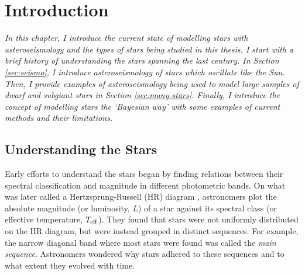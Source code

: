 %
%
%
%
%
\chapter[Introduction]{Introduction}

\textit{In this chapter, I introduce the current state of modelling stars with asteroseismology and the types of stars being studied in this thesis. I start with a brief history of understanding the stars spanning the last century. In Section \ref{sec:seismo}, I introduce asteroseismology of stars which oscillate like the Sun. Then, I provide examples of asteroseismology being used to model large samples of dwarf and subgiant stars in Section \ref{sec:many-stars}. Finally, I introduce the concept of modelling stars the `Bayesian way' with some examples of current methods and their limitations.}



\section{Understanding the Stars}\label{sec:stars}

Early efforts to understand the stars began by finding relations between their spectral classification and magnitude in different photometric bands. On what was later called a Hertzsprung-Russell (HR) diagram \citep[e.g.][]{Russell1914}, astronomers plot the absolute magnitude (or luminosity, \(L\)) of a star against its spectral class (or effective temperature, \({T_\mathrm{eff}}\)). They found that stars were not uniformly distributed on the HR diagram, but were instead grouped in distinct sequences. For example, the narrow diagonal band where most stars were found was called the \emph{main sequence}. Astronomers wondered why stars adhered to these sequences and to what extent they evolved with time.

